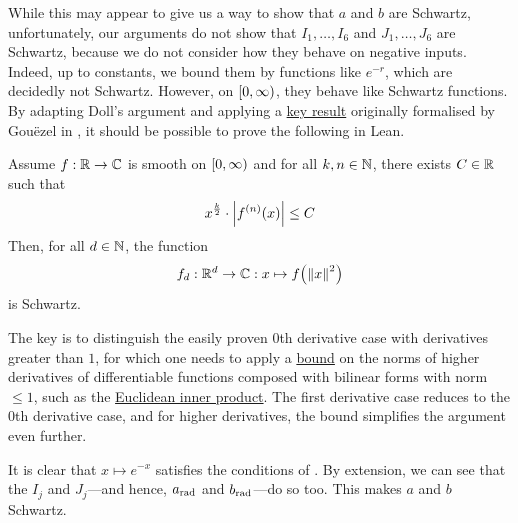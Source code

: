 While this may appear to give us a way to show that $a$ and $b$ are Schwartz, unfortunately, our arguments do not show that $I_1, \ldots, I_6$ and $J_1, \ldots, J_6$ are Schwartz, because we do not consider how they behave on negative inputs. Indeed, up to constants, we bound them by functions like $e^{-r}$, which are decidedly not Schwartz. However, on $\left[0, \infty\right)$, they behave like Schwartz functions. By adapting Doll's argument and applying a \href{https://github.com/leanprover-community/mathlib4/blame/8b8fe2fa631658e55895b284747a997a249d3599/Mathlib/Analysis/Calculus/ContDiff/Bounds.lean#L350}{key result} originally formalised by Gouëzel in , it should be possible to prove the following in Lean. 
\begin{boxtheorem}\label{Ch5:Thm:SchwartzLike_to_Schwartz}
    Assume $f : \mathbb{R} \to \mathbb{C}$ is smooth on $\left[0, \infty\right)$ and for all $k, n \in \mathbb{N}$, there exists $C \in \mathbb{R}$ such that
    \begin{align*}
        x^{\frac{k}{2}} \cdot \left\lvert f^{(n)}\!\left( x \right) \right\rvert \leq C
    \end{align*}
    Then, for all $d \in \mathbb{N}$, the function
    \begin{align*}
        f_d : \mathbb{R}^d \to \mathbb{C} : x \mapsto f\!\left( \left\lVert x \right\rVert^2 \right)
    \end{align*}
    is Schwartz.
\end{boxtheorem}
The key is to distinguish the easily proven $0$th derivative case with derivatives greater than $1$, for which one needs to apply a \href{https://github.com/leanprover-community/mathlib4/blob/5a2eaa85c555c4263e15928cef249cbaad2eb2d2/Mathlib/Analysis/Calculus/ContDiff/Bounds.lean#L230}{bound} on the norms of higher derivatives of differentiable functions composed with bilinear forms with norm $\le 1$, such as the \href{https://github.com/leanprover-community/mathlib4/blob/5a2eaa85c555c4263e15928cef249cbaad2eb2d2/Mathlib/Analysis/InnerProductSpace/LinearMap.lean#L260}{Euclidean inner product}. The first derivative case reduces to the $0$th derivative case, and for higher derivatives, the bound simplifies the argument even further.

It is clear that $x \mapsto e^{-x}$ satisfies the conditions of . By extension, we can see that the $I_j$ and $J_j$---and hence, $a_{\operatorname{rad}}$ and $b_{\operatorname{rad}}$---do so too. This makes $a$ and $b$ Schwartz.

